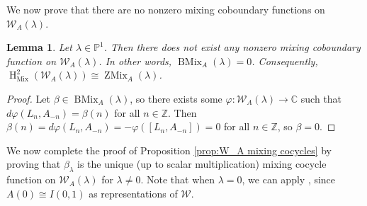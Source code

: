 \documentclass[11pt, svgnames]{amsart}
\newcommand{\ZZ}{\mathbb{Z}}
\newcommand{\CC}{\mathbb{C}}
\newcommand{\PP}{\mathbb{P}}
\newcommand{\W}{\mathcal{W}}
\DeclareMathOperator{\HH}{H}
\DeclareMathOperator{\Mix}{Mix}
\DeclareMathOperator{\ZMix}{ZMix}
\DeclareMathOperator{\BMix}{BMix}
\newtheorem{lemma}[proposition]{Lemma}
\theoremstyle{definition}
\begin{document}
We now prove that there are no nonzero mixing coboundary functions on $\W_A(\lambda)$.

\begin{lemma}\label{lem:no mixing coboundaries}
    Let $\lambda \in \PP^1$. Then there does not exist any nonzero mixing coboundary function on $\W_A(\lambda)$. In other words, $\BMix_A(\lambda) = 0$. Consequently, $\HH_{\Mix}^2(\W_A(\lambda)) \cong \ZMix_A(\lambda)$.
\end{lemma}
\begin{proof}
    Let $\beta \in \BMix_A(\lambda)$, so there exists some $\varphi \colon \W_A(\lambda) \to \CC$ such that $d\varphi(L_n, A_{-n}) = \beta(n)$ for all $n \in \ZZ$. Then $\beta(n) = d\varphi(L_n, A_{-n}) = -\varphi([L_n, A_{-n}]) = 0$ for all $n \in \ZZ$, so $\beta = 0$.
\end{proof}

We now complete the proof of Proposition \ref{prop:W_A mixing cocycles} by proving that $\beta_\lambda$ is the unique (up to scalar multiplication) mixing cocycle function on $\W_A(\lambda)$ for $\lambda \neq 0$. Note that when $\lambda = 0$, we can apply \cite[Theorem 2.3]{GaoJiangPei}, since $A(0) \cong I(0,1)$ as representations of $\W$.
\end{document}
